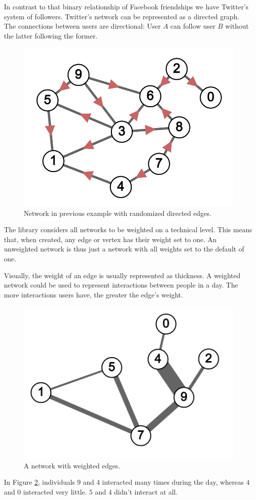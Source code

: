 In contrast to that binary relationship of Facebook friendships we have Twitter's system of followers.
Twitter's network can be represented as a directed graph.
The connections between users are directional:
User $A$ can follow user $B$ without the latter following the former.

\begin{figure}[H]
  \includegraphics[width=\linewidth]{img/directed_sample.png}
  \caption{Network in previous example with randomized directed edges.}
  \label{fig:net_di}
\end{figure}

The library considers all networks to be weighted on a technical level.
This means that, when created, any edge or vertex has their weight set to one.
An unweighted network is thus just a network with all weights set to the default of one.

Visually, the weight of an edge is usually represented as thickness.
A weighted network could be used to represent interactions between people in a day.
The more interactions users have, the greater the edge's weight.

\begin{figure}[H]
  \includegraphics[width=\linewidth]{img/weighted_sample.png}
  \caption{A network with weighted edges.}
  \label{fig:net_weight}
\end{figure}

In Figure \ref{fig:net_weight}, individuals $9$ and $4$
interacted many times during the day, whereas $4$ and $0$
interacted very little. $5$ and $4$ didn't interact at all.